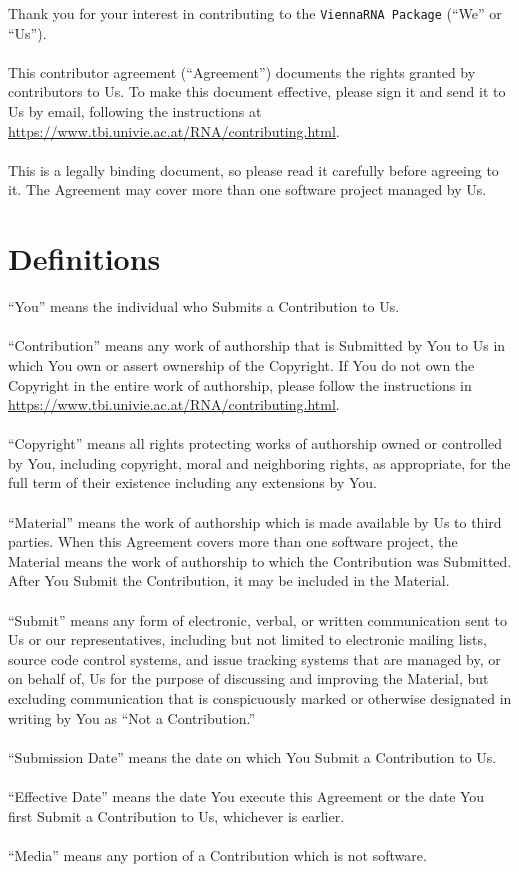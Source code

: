 \documentclass{article}
\begin{document}
\noindent
Thank you for your interest in contributing to the \texttt{ViennaRNA Package}
(``We'' or ``Us'').
\\\\
\noindent
This contributor agreement (``Agreement'') documents the rights granted by
contributors to Us. To make this document effective, please sign it and send it
to Us by email, following the instructions at
\url{https://www.tbi.univie.ac.at/RNA/contributing.html}.\\\\
This is a legally binding document, so please read it carefully before agreeing
to it. The Agreement may cover more than one software project managed by Us.


\section{Definitions}
\noindent
``You'' means the individual who Submits a Contribution to Us.
\\
\\
\noindent
``Contribution'' means any work of authorship that is Submitted by You to Us in
which You own or assert ownership of the Copyright. If You do not own the
Copyright in the entire work of authorship, please follow the instructions in
\url{https://www.tbi.univie.ac.at/RNA/contributing.html}.
\\
\\
\noindent
``Copyright'' means all rights protecting works of authorship owned or
controlled by You, including copyright, moral and neighboring rights, as
appropriate, for the full term of their existence including any extensions by
You.
\\
\\
\noindent
``Material'' means the work of authorship which is made available by Us to third
parties. When this Agreement covers more than one software project, the Material
means the work of authorship to which the Contribution was Submitted. After You
Submit the Contribution, it may be included in the Material.
\\
\\
\noindent
``Submit'' means any form of electronic, verbal, or written communication sent
to Us or our representatives, including but not limited to electronic mailing
lists, source code control systems, and issue tracking systems that are managed
by, or on behalf of, Us for the purpose of discussing and improving the
Material, but excluding communication that is conspicuously marked or otherwise
designated in writing by You as ``Not a Contribution.''
\\
\\
\noindent
``Submission Date'' means the date on which You Submit a Contribution to Us.
\\
\\
\noindent
``Effective Date'' means the date You execute this Agreement or the date You
first Submit a Contribution to Us, whichever is earlier.
\\
\\
\noindent
``Media'' means any portion of a Contribution which is not software.
\end{document}
